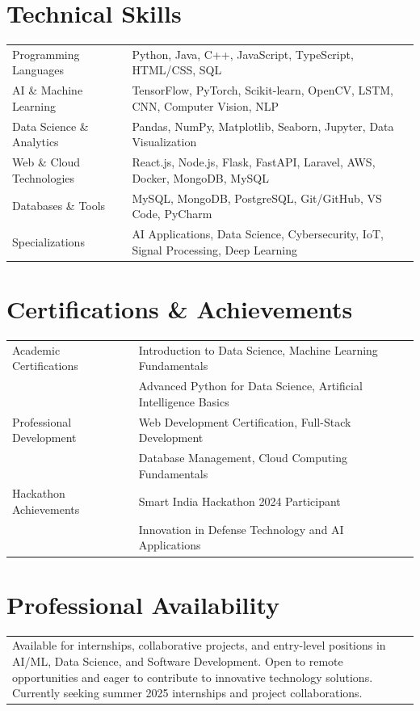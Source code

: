 \documentclass[a4paper,12pt]{article}
\begin{document}
\section{Technical Skills}
\begin{tabularx}{\linewidth}{@{}l X@{}}
Programming Languages &  \normalsize{Python, Java, C++, JavaScript, TypeScript, HTML/CSS, SQL}\\
AI \& Machine Learning &  \normalsize{TensorFlow, PyTorch, Scikit-learn, OpenCV, LSTM, CNN, Computer Vision, NLP}\\
Data Science \& Analytics &  \normalsize{Pandas, NumPy, Matplotlib, Seaborn, Jupyter, Data Visualization}\\
Web \& Cloud Technologies &  \normalsize{React.js, Node.js, Flask, FastAPI, Laravel, AWS, Docker, MongoDB, MySQL}\\
Databases \& Tools &  \normalsize{MySQL, MongoDB, PostgreSQL, Git/GitHub, VS Code, PyCharm}\\
Specializations &  \normalsize{AI Applications, Data Science, Cybersecurity, IoT, Signal Processing, Deep Learning}\\
\end{tabularx}

\section{Certifications \& Achievements}
\begin{tabularx}{\linewidth}{@{}l X@{}}
Academic Certifications & Introduction to Data Science, Machine Learning Fundamentals \\
& Advanced Python for Data Science, Artificial Intelligence Basics \\
Professional Development & Web Development Certification, Full-Stack Development \\
& Database Management, Cloud Computing Fundamentals \\
Hackathon Achievements & Smart India Hackathon 2024 Participant \\
& Innovation in Defense Technology and AI Applications \\
\end{tabularx}

\section{Professional Availability}
\begin{tabularx}{\linewidth}{@{}X@{}}
Available for internships, collaborative projects, and entry-level positions in AI/ML, Data Science, and Software Development. Open to remote opportunities and eager to contribute to innovative technology solutions. Currently seeking summer 2025 internships and project collaborations.
\end{tabularx}

\end{document}

